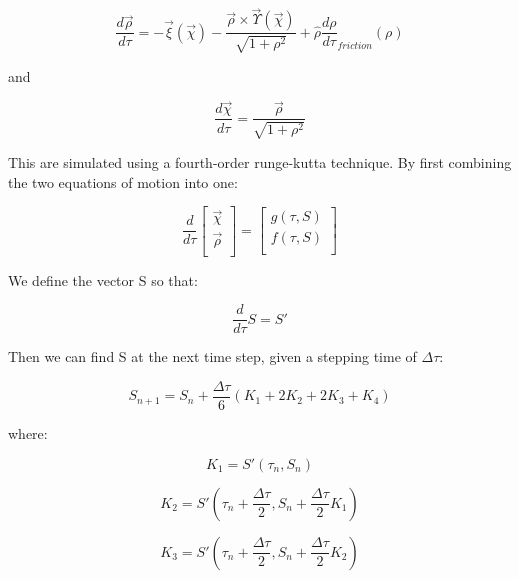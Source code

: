 \documentclass[]{article}
\begin{document}
\begin{equation}
\frac{d \vec{\rho}}{ d \tau} = -\vec{\xi}(\vec{\chi}) -\frac{\vec{\rho} \times \vec{\Upsilon}(\vec{\chi}) }{\sqrt{ 1 + \rho^2 }} + \hat{\rho} \frac{d \rho}{d \tau}_{friction}(\rho)
\end{equation}

and 

\begin{equation}
\frac{d \vec{\chi}}{d \tau} = \frac{\vec{\rho}}{\sqrt{1+\rho^2}}
\end{equation}

This are simulated using a fourth-order runge-kutta technique. By first combining the two equations of motion into one:


\begin{equation}
\frac{d}{d \tau}  
\left[ \begin{array}{c}
\vec{ \chi }\\
\vec{\rho} \\
\end{array} \right]
=
\left[ \begin{array}{c}
g(\tau, S )\\
f(\tau, S ) \\
\end{array} \right]
\end{equation}

We define the vector S so that:

\begin{equation} 
\frac{d}{d \tau} S = S'
\end{equation}

Then we can find S at the next time step, given a stepping time of $\Delta \tau$:

\begin{equation}
S_{n+1} = S_n + \frac{\Delta\tau}{6} ( K_1 + 2K_2 + 2K_3 + K_4 )
\end{equation}

where:

\begin{equation} 
K_1=S'(\tau_n, S_n)
\end{equation}

\begin{equation} 
K_2=S'(\tau_n + \frac{\Delta\tau}{2}, S_n + \frac{\Delta\tau}{ 2}K_1)
\end{equation}

\begin{equation} 
K_3=S'(\tau_n + \frac{\Delta\tau}{2}, S_n + \frac{\Delta\tau}{ 2}K_2)
\end{equation}
\end{document}
